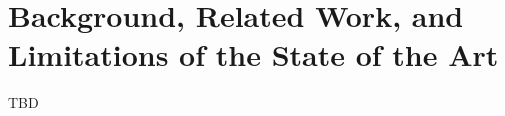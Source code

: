 
\section{Background, Related Work, and Limitations of the State of the Art}
\label{sec:background}
TBD